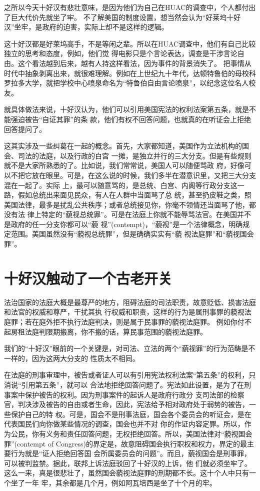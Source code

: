 \documentclass[10pt]{article}
\begin{document}
{之所以今天十好汉有悲壮意味，是因为他们为自己在HUAC的调查中，个人都付出了巨大代价\myrule 先就坐了牢。
不了解美国的制度设置，想当然会认为``好莱坞十好汉''坐牢，是政府的迫害，实际上却不是这样的逻辑。

这十好汉都是好莱坞高手，不是等闲之辈。所以在HUAC调查中，他们有自己比较独立的思考和态度，例如，他们觉
得电影只是个言论表达，调查是干涉言论自由。这个看法越到后来，越有人持这样看法，因为事件的背景消失了。
把事情从时代中抽象剥离出来，就很难理解。例如在上世纪九十年代，达顿\textperiodcentered 特鲁伯的母校科
罗拉多大学，就把学校中心喷泉命名为``特鲁伯自由言论喷泉''，以纪念这位名人校友。

就具体做法来说，十好汉认为，他们可以引用美国宪法的权利法案第五条，就是不能强迫被告``自证其罪''的条
款，他们有权不回答问题，也就真的在听证会上拒绝回答提问了。

这其实涉及一些纠葛在一起的概念。首先，大家都知道，美国作为立法机构的国会、司法的法庭，以及行政的白宫
一摊，是独立并行的三大分支。但是有些规则就不是大家所熟悉的了。比如说，我们常常说，美国人可以随便骂政
府，好像可以不把它放在眼里。可是，在这么说的时候，我们多半在潜意识里，又把三大分支混在一起了。实际
上，最可以随意骂的，是总统、白宫、内阁等行政分支这一路，假如总统出来面见民众，有人在人群中当面骂了总
统，甚至扔皮鞋之类，照美国法律，最多是扰乱公共秩序；或者总统接见你，你毫不领情还当面骂了他，都没有法
律上特定的``藐视总统罪''。可是在法庭上你就不能辱骂法官。在美国并不是政府的任一分支你都可以``藐
视''(contempt)，``藐视''是一个法律概念，明确规定范围。美国虽然没有``藐视总统罪''，但是确确实实有``藐
视法庭罪''和``藐视国会罪''。

\pagebreak
\section{十好汉触动了一个古老开关}

法治国家的法庭大概是最尊严的地方，阻碍法庭的司法职责，故意贬低、损害法庭和法官的权威和尊严，干扰其执
行权威和职责，这样的行为是属刑事罪的藐视法庭罪；若在庭外拒不执行法庭判决，则是属于民事罪的藐视法庭罪。
例如你付不起房租法庭判限期搬离，你不搬的话，算民事范围的藐视法庭罪。

我们的``十好汉''眼前的一个关键是，对司法、立法的两个``藐视罪''的行为范畴是不一样的，因为这两大分支的
性质太不相同。

在法庭的刑事审理中，被告或者证人可以有引用宪法权利法案``第五条''的权利，只消说``引用第五条''，就可以
合法地拒绝回答问题了。宪法如此设置，是为了在刑事案中保护被告的权利。因为刑事案件的起诉人是政府行政分
支司法部的检察官，判决涉及被告的自由或者生命，因此，宪法给予相对政府处于弱势的被告，一些保护自己的特
权。可是，国会不是刑事法庭，国会各个委员会的听证会，是在代表国民们向你做某些情况的调查，国会也并不对
你的作证内容定罪。所以，作为公民，你有义务和责任回答问题，无权拒绝回答。所以，美国法律对``藐视国会
罪''(contempt of Congress)的界定是，故意阻碍国会执行职权和权力，界定的最主要行为就是``证人拒绝回答国
会所属委员会的问题''。而且，藐视国会是刑事罪，可以被判监禁。据此，联邦上诉法庭驳回了十好汉的上诉，他
们就必须坐牢了。这么一来，真是很悲壮了，虽然国会藐视法庭罪的刑期都不长。这十个人中只有一个坐了一年
牢，其余都是几个月，例如阿瓦\textperiodcentered 培西是坐了十个月的牢。

}
\end{document}
